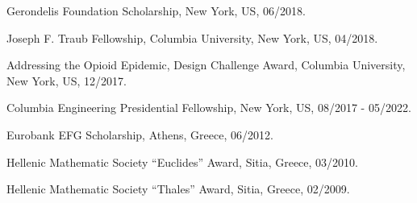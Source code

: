 \documentclass[letterpaper]{article}
\renewenvironment{itemize}{
  \begin{list}{}{
    \setlength{\leftmargin}{1.5em}
  }
}{
  \end{list}
}
\begin{document}
\begin{itemize}

  \item Gerondelis Foundation Scholarship, New York, US, 06/2018.
\item Joseph F. Traub Fellowship, Columbia University, New York, US, 04/2018.
\item Addressing the Opioid Epidemic, Design Challenge Award, Columbia University, New York, US, 12/2017.
\item Columbia Engineering Presidential Fellowship, New York, US, 08/2017 - 05/2022.
\item Eurobank EFG Scholarship, Athens, Greece, 06/2012.
\item Hellenic Mathematic Society ``Euclides'' Award, Sitia, Greece, 03/2010.
\item Hellenic Mathematic Society ``Thales'' Award, Sitia, Greece, 02/2009.
\end{itemize}

\iffalse
\section*{Technical Skills}
\begin{itemize}
    \item Programming: Python (PyTorch, Tensorflow, Keras, ...), C++, Java, MATLAB, R, C, Javascript, ...
    \item Version Control \& Project Management: Git, SVN, JIRA, Jenkins.
    \item Agile Development: Scrum, Kanban.
\end{itemize}

\section*{Extracurricular Activities}
\begin{itemize}
    \item Music: bass guitar, guitar, clarinet, ukulele, guitalele.
    \item Sports: windsurfing, tennis, squash, running, hiking.
    \item Dance: salsa (in progress), cretan folk.
    \item Photography: dslr, mobile.
\end{itemize}

\section*{Languages}
\begin{itemize}
    \item English (fluent), French (intermediate), Greek (native), Spanish (beginner).
\end{itemize}
\fi
\end{document}
